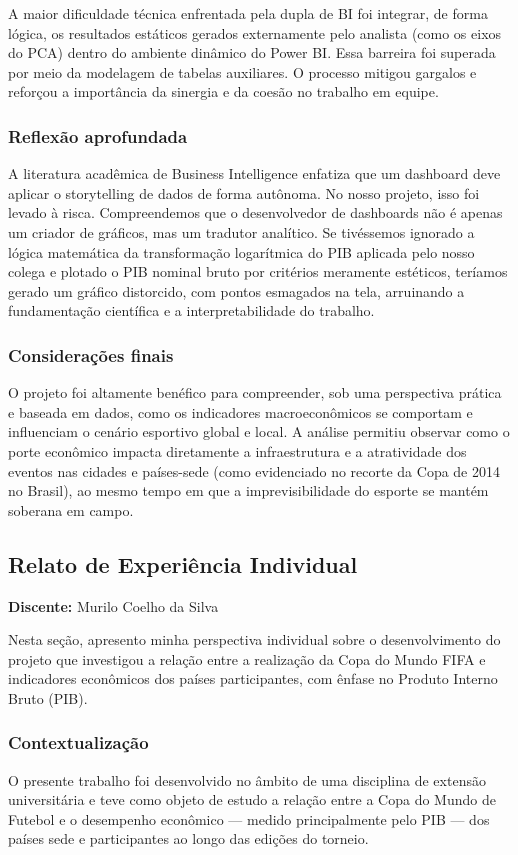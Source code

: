 \documentclass[12pt, a4paper, brazil]{article}
\begin{document}
A maior dificuldade técnica enfrentada pela dupla de BI foi integrar, de forma lógica, os resultados estáticos gerados externamente pelo analista (como os eixos do PCA) dentro do ambiente dinâmico do Power BI. Essa barreira foi superada por meio da modelagem de tabelas auxiliares. O processo mitigou gargalos e reforçou a importância da sinergia e da coesão no trabalho em equipe.

\subsubsection{Reflexão aprofundada}
A literatura acadêmica de Business Intelligence enfatiza que um dashboard deve aplicar o storytelling de dados de forma autônoma. No nosso projeto, isso foi levado à risca. Compreendemos que o desenvolvedor de dashboards não é apenas um criador de gráficos, mas um tradutor analítico. Se tivéssemos ignorado a lógica matemática da transformação logarítmica do PIB aplicada pelo nosso colega e plotado o PIB nominal bruto por critérios meramente estéticos, teríamos gerado um gráfico distorcido, com pontos esmagados na tela, arruinando a fundamentação científica e a interpretabilidade do trabalho.

\subsubsection{Considerações finais}
O projeto foi altamente benéfico para compreender, sob uma perspectiva prática e baseada em dados, como os indicadores macroeconômicos se comportam e influenciam o cenário esportivo global e local. A análise permitiu observar como o porte econômico impacta diretamente a infraestrutura e a atratividade dos eventos nas cidades e países-sede (como evidenciado no recorte da Copa de 2014 no Brasil), ao mesmo tempo em que a imprevisibilidade do esporte se mantém soberana em campo.

\subsection{Relato de Experiência Individual}
\textbf{Discente:} Murilo Coelho da Silva

Nesta seção, apresento minha perspectiva individual sobre o desenvolvimento do projeto que investigou a relação entre a realização da Copa do Mundo FIFA e indicadores econômicos dos países participantes, com ênfase no Produto Interno Bruto (PIB).

\subsubsection{Contextualização}
O presente trabalho foi desenvolvido no âmbito de uma disciplina de extensão universitária e teve como objeto de estudo a relação entre a Copa do Mundo de Futebol e o desempenho econômico — medido principalmente pelo PIB — dos países sede e participantes ao longo das edições do torneio.
\end{document}
